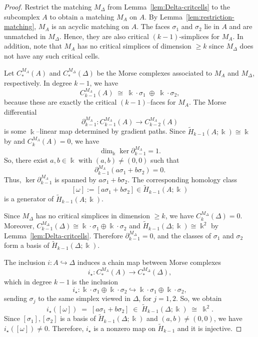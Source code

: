 \documentclass[10pt,a4paper]{amsart}
\begin{document}
\begin{proof}
Restrict the matching $M_\Delta$ from Lemma~\ref{lem:Delta-critcells} to the subcomplex $A$ to obtain a matching $M_A$ on $A$. By Lemma~\ref{lem:restriction-matching}, $M_A$ is an acyclic matching on $A$. The faces $\sigma_1$ and $\sigma_2$ lie in $A$ and are unmatched in $M_\Delta$. Hence, they are also critical $(k-1)$-simplices for $M_A$. In addition, note that $M_A$ has no critical simplices of dimension $\geq k$ since $M_{\Delta}$ does not have any such critical cells.

Let $C^{M_A}_\ast(A)$ and $C^{M_\Delta}_\ast(\Delta)$ be the Morse complexes associated to $M_A$ and $M_\Delta$, respectively. In degree $k-1$, we have
\[
  C^{M_A}_{k-1}(A) \;\cong\; \Bbbk\cdot\sigma_1 \;\oplus\; \Bbbk\cdot\sigma_2,
\]
because these are exactly the critical $(k-1)$--faces for $M_A$. The Morse differential
\[
  \partial_{k-1}^{M_A}\colon C^{M_A}_{k-1}(A) \longrightarrow C^{M_A}_{k-2}(A)
\]
is some $\Bbbk$--linear map determined by gradient paths. Since $\widetilde H_{k-1}(A;\Bbbk)\cong \Bbbk$ by  and $C^{M_A}_{k}(A)=0$, we have
\[
  \dim_\Bbbk \ker \partial_{k-1}^{M_A} = 1.
\]
So, there exist $a,b\in\Bbbk$ with $(a,b)\neq (0,0)$ such that
\[
  \partial_{k-1}^{M_A}(a\sigma_1 + b\sigma_2) = 0.
\]
Thus, $\ker \partial_{k-1}^{M_A}$ is spanned by $a\sigma_1 + b\sigma_2$. The corresponding homology class
\[
  [\omega] := [ a\sigma_1 + b\sigma_2 ] \in \widetilde H_{k-1}(A;\Bbbk)
\]
is a generator of $\widetilde H_{k-1}(A;\Bbbk)$.


Since $M_\Delta$ has no critical simplices in dimension $\ge k$, we have
$C^{M_\Delta}_{k}( \Delta)=0$. Moreover,
$C^{M_\Delta}_{k-1}(\Delta)\cong \Bbbk\cdot\sigma_1\oplus \Bbbk\cdot\sigma_2$
and $\widetilde H_{k-1}(\Delta;\Bbbk)\cong \Bbbk^2$ by Lemma~\ref{lem:Delta-critcells}.
Therefore $\partial^{M_\Delta}_{k-1}=0$, and the classes of $\sigma_1$ and $\sigma_2$
form a basis of $\widetilde H_{k-1}(\Delta;\Bbbk)$.



The inclusion $i\colon A\hookrightarrow\Delta$ induces a chain map between Morse complexes
\[
  i_{\star}\colon C^{M_A}_\ast(A) \longrightarrow C^{M_\Delta}_\ast(\Delta),
\]
which in degree $k-1$ is  the inclusion
\[
  i_{\star}\colon \Bbbk\cdot\sigma_1 \oplus \Bbbk\cdot\sigma_2
  \hookrightarrow 
  \Bbbk\cdot\sigma_1 \oplus \Bbbk\cdot\sigma_2,
\]
sending $\sigma_j$ to the same simplex viewed in $\Delta$, for $j=1,2$. So,  we obtain
\[
  i_{\star}([\omega]) 
  \;=\; [ a\sigma_1 + b\sigma_2 ] 
  \;\in\; \widetilde H_{k-1}(\Delta;\Bbbk)
  \;\cong\; \Bbbk^2.
\]
Since $[\sigma_1],[\sigma_2]$ is a basis of $\widetilde H_{k-1}(\Delta;\Bbbk)$ and $(a,b)\neq (0,0)$, we have $i_{\star}([\omega])\neq 0$. Therefore, $i_{\star}$ is a nonzero  map on $\widetilde H_{k-1}$ and it is injective.
\end{proof}
\end{document}
